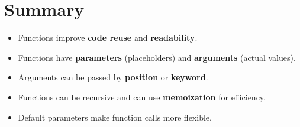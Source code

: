 \section{Summary}
\begin{itemize}
	\item Functions improve \textbf{code reuse} and \textbf{readability}.
	\item Functions have \textbf{parameters} (placeholders) and \textbf{arguments} (actual values).
	\item Arguments can be passed by \textbf{position} or \textbf{keyword}.
	\item Functions can be recursive and can use \textbf{memoization} for efficiency.
	\item Default parameters make function calls more flexible.
\end{itemize}
